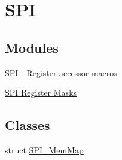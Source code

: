 \hypertarget{group___s_p_i___peripheral}{}\section{S\+PI}
\label{group___s_p_i___peripheral}
\subsection*{Modules}
\begin{DoxyCompactItemize}
\item 
\hyperlink{group___s_p_i___register___accessor___macros}{S\+P\+I -\/ Register accessor macros}
\item 
\hyperlink{group___s_p_i___register___masks}{S\+P\+I Register Masks}
\end{DoxyCompactItemize}
\subsection*{Classes}
\begin{DoxyCompactItemize}
\item 
struct \hyperlink{struct_s_p_i___mem_map}{S\+P\+I\+\_\+\+Mem\+Map}
\end{DoxyCompactItemize}
